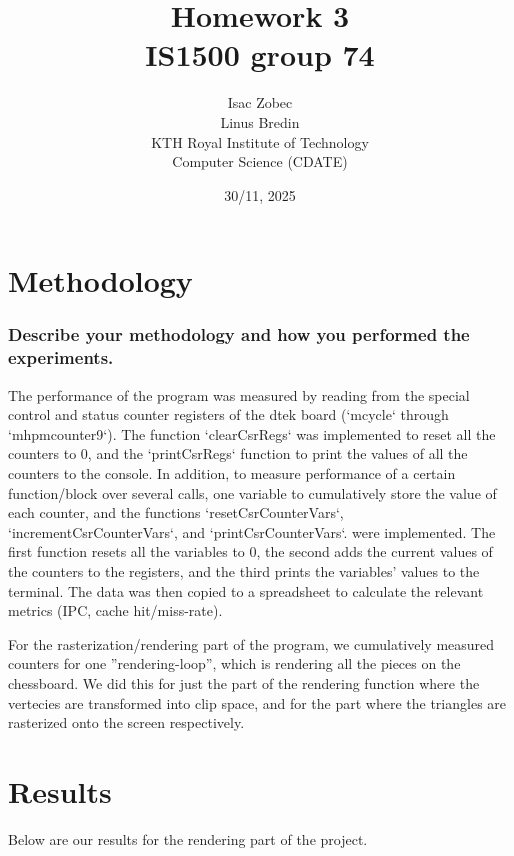 \documentclass{article}
\title{\textbf{Homework 3}\\\Large{IS1500 group 74}}
\author{Isac Zobec \\ Linus Bredin \\ KTH Royal Institute of Technology\\  Computer Science (CDATE)}
\date{30/11, 2025}
\begin{document}
\maketitle
\thispagestyle{fancy}
\clearpage
\tableofcontents
\thispagestyle{fancy}

\clearpage
\fancyfoot[C]{\thepage}

\newpage

\section{Methodology}

\subsubsection*{Describe your methodology and how you performed the experiments.}

The performance of the program was measured by reading from the special control and status counter registers of the dtek board (`mcycle` through `mhpmcounter9`). The function `clearCsrRegs` was implemented to reset all the counters to 0, and the `printCsrRegs` function to print the values of all the counters to the console. In addition, to measure performance of a certain function/block over several calls, one variable to cumulatively store the value of each counter, and the functions `resetCsrCounterVars`, `incrementCsrCounterVars`, and `printCsrCounterVars`. were implemented. The first function resets all the variables to 0, the second adds the current values of the counters to the registers, and the third prints the variables' values to the terminal. The data was then copied to a spreadsheet to calculate the relevant metrics (IPC, cache hit/miss-rate).

For the rasterization/rendering part of the program, we cumulatively measured counters for one ''rendering-loop'', which is rendering all the pieces on the chessboard. We did this for just the part of the rendering function where the vertecies are transformed into clip space, and for the part where the triangles are rasterized onto the screen respectively.  

\section{Results}

Below are our results for the rendering part of the project.


\end{document}
